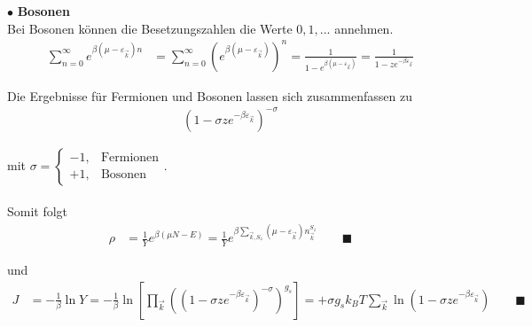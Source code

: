 \documentclass{article}
\newcommand{\lr}[1]{\left(#1\right)}
\newcommand{\lreck}[1]{\left[#1\right]}
\begin{document}
{	$\bullet$ \textbf{Bosonen}\\
	Bei Bosonen können die Besetzungszahlen die Werte $0,1,...$ annehmen.
		\begin{align*}
			\sum_{n=0}^\infty e^{\beta(\mu - \varepsilon_{\vec{k}}) n} &= \sum_{n=0}^\infty \lr{ e^{\beta(\mu - \varepsilon_{\vec{k}})} }^n = \frac{1}{1 - e^{\beta(\mu - \varepsilon_{\vec{k}}) }} = \frac{1}{1 - z e^{-\beta\varepsilon_{\vec{k}}}}
		\end{align*}

	Die Ergebnisse für Fermionen und Bosonen lassen sich zusammenfassen zu
		\begin{align*}
			(1 - \sigma z e^{-\beta \varepsilon_{\vec{k}}})^{-\sigma}
		\end{align*}
	
	mit $\sigma=\begin{cases}-1,& \text{Fermionen}\\+1,&\text{Bosonen}\end{cases}$.\\
	\\
	Somit folgt
		\begin{align*}
			\rho &= \frac{1}{Y} e^{\beta(\mu N - E) } = \frac{1}{Y} e^{\beta \sum_{\vec{k},S_z}(\mu - \varepsilon_{\vec{k}}) n_{\vec{k}}^{S_z} } \qquad \blacksquare
		\end{align*}
	
	und	
		\begin{align*}
			J &= -\frac{1}{\beta} \ln Y = -\frac{1}{\beta} \ln \lreck{ \prod_{\vec{k}} \lr{ (1 - \sigma z e^{-\beta \varepsilon_{\vec{k}}})^{-\sigma} }^{g_s} } = +\sigma g_s k_B T \sum_{\vec{k}} \ln (1 - \sigma z e^{-\beta \varepsilon_{\vec{k}}}) \qquad \blacksquare
		\end{align*}
	
}
\end{document}
